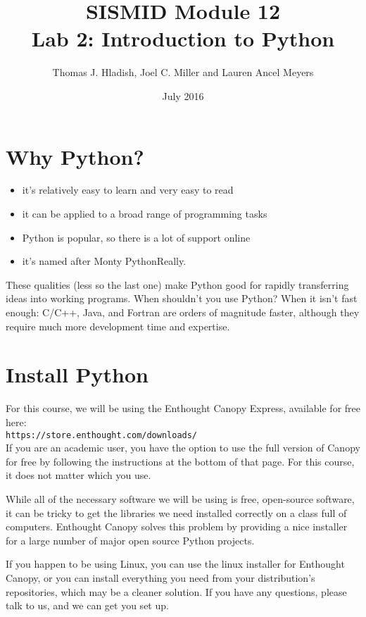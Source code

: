 \documentclass{article}
\begin{document}
\title{SISMID Module 12\\Lab 2: Introduction to Python}
\author{Thomas J. Hladish, Joel C. Miller and Lauren Ancel Meyers}
\date{July 2016}
\maketitle

\section*{Why Python?}
\begin{itemize}
\item it's relatively easy to learn and very easy to read
\item it can be applied to a broad range of programming tasks
\item Python is popular, so there is a lot of support online
\item it's named after Monty Python\textemdash Really.
\end{itemize}

These qualities (less so the last one) make Python good for rapidly transferring ideas into working programs.  When shouldn't you use Python?  When it
isn't fast enough: C/C++, Java, and Fortran are orders of magnitude faster, although they require much more development time and expertise.

\section*{Install Python}

For this course, we will be using the Enthought Canopy Express, available for free here:\\

\texttt{https://store.enthought.com/downloads/}\\

\noindent
If you are an academic user, you have the option to use the full version of Canopy for free by following the instructions at the bottom of that page.  For this course, it does not matter which you use.

While all of the necessary software we will be using is free, open-source software, it can be tricky to get the libraries we need installed correctly on a class full of computers. Enthought Canopy solves this problem by providing a nice installer for a large number of major open source Python projects.

If you happen to be using Linux, you can use the linux installer for Enthought Canopy, or you can install everything you need from your distribution's repositories, which may be a cleaner solution.  If you have any questions, please talk to us, and we can get you set up.
\end{document}
